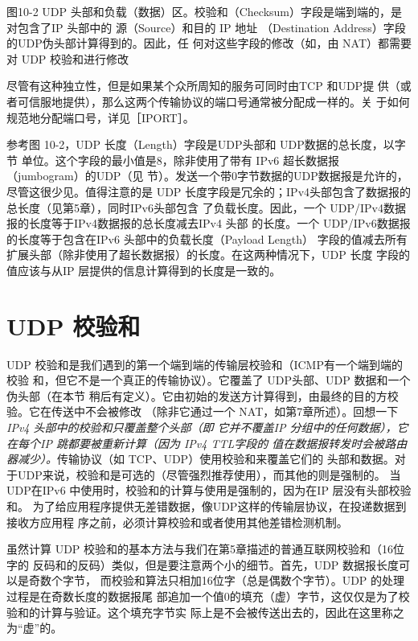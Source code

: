 图10-2 UDP 头部和负载（数据）区。校验和（Checksum）字段是端到端的，是对包含了IP 头部中的
源（Source）和目的 IP 地址 （Destination Address）字段的UDP伪头部计算得到的。因此，任
何对这些字段的修改（如，由 NAT）都需要对 UDP 校验和进行修改

\begin{tcolorbox}    
    尽管有这种独立性，但是如果某个众所周知的服务可同时由TCP 和UDP提
    供（或者可信服地提供），那么这两个传输协议的端口号通常被分配成一样的。关
    于如何规范地分配端口号，详见［IPORT］。
\end{tcolorbox}

参考图 10-2，UDP 长度（Length）字段是UDP头部和 UDP数据的总长度，以字节
单位。这个字段的最小值是8，除非使用了带有 IPv6 超长数据报（jumbogram）的UDP（见
节）。发送一个带0字节数据的UDP数据报是允许的，尽管这很少见。值得注意的是
UDP 长度字段是冗余的；IPv4头部包含了数据报的总长度（见第5章），同时IPv6头部包含
了负载长度。因此，一个 UDP/IPv4数据报的长度等于IPv4数据报的总长度减去IPv4 头部
的长度。一个 UDP/IPv6数据报的长度等于包含在IPv6 头部中的负载长度（Payload Length）
字段的值减去所有扩展头部（除非使用了超长数据报）的长度。在这两种情况下，UDP 长度
字段的值应该与从IP 层提供的信息计算得到的长度是一致的。

\section{UDP 校验和}
UDP 校验和是我们遇到的第一个端到端的传输层校验和（ICMP有一个端到端的校验
和，但它不是一个真正的传输协议）。它覆盖了 UDP头部、UDP 数据和一个伪头部（在本节
稍后有定义）。它由初始的发送方计算得到，由最终的目的方校验。它在传送中不会被修改
（除非它通过一个 NAT，如第7章所述）。回想一下\emph{ IPv4 头部中的校验和只覆盖整个头部（即
它并不覆盖IP 分组中的任何数据），它在每个IP 跳都要被重新计算（因为 IPv4 TTL字段的
值在数据报转发时会被路由器减少）。}传输协议（如 TCP、UDP）使用校验和来覆盖它们的
头部和数据。对于UDP来说，校验和是可选的（尽管强烈推荐使用），而其他的则是强制的。
当UDP在IPv6 中使用时，校验和的计算与使用是强制的，因为在IP 层没有头部校验和。
为了给应用程序提供无差错数据，像UDP这样的传输层协议，在投递数据到接收方应用程
序之前，必须计算校验和或者使用其他差错检测机制。

虽然计算 UDP 校验和的基本方法与我们在第5章描述的普通互联网校验和（16位字的
反码和的反码）类似，但是要注意两个小的细节。首先，UDP 数据报长度可以是奇数个字节，
而校验和算法只相加16位字（总是偶数个字节）。UDP 的处理过程是在奇数长度的数据报尾
部追加一个值0的填充（虚）字节，这仅仅是为了校验和的计算与验证。这个填充字节实
际上是不会被传送出去的，因此在这里称之为“虚”的。

